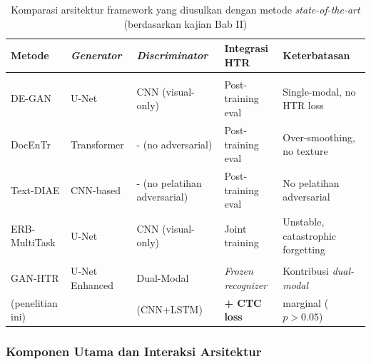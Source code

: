 \begin{table}[H]
\centering
\caption{Komparasi arsitektur framework yang diusulkan dengan metode \textit{state-of-the-art} (berdasarkan kajian Bab II)}
\label{tab:arsitektur-komparasi}
\footnotesize
\begin{tabularx}{\textwidth}{|>{\raggedright\arraybackslash}X|>{\raggedright\arraybackslash}X|>{\raggedright\arraybackslash}X|>{\raggedright\arraybackslash}X|>{\raggedright\arraybackslash}X|}
\hline
\textbf{Metode} & \textit{Generator} & \textit{Discriminator} & Integrasi HTR & Keterbatasan \\
\hline
\multicolumn{5}{|l|}{Metode \textit{Existing} (Bab II)} \\
\hline
DE-GAN & U-Net & CNN (visual-only) & Post-training eval & Single-modal, no HTR loss \\
\hline
DocEnTr & Transformer & - (no adversarial) & Post-training eval & Over-smoothing, no texture \\
\hline
Text-DIAE & CNN-based & - (no pelatihan adversarial) & Post-training eval & No pelatihan adversarial \\
\hline
ERB-MultiTask & U-Net & CNN (visual-only) & Joint training & Unstable, catastrophic forgetting \\
\hline
\multicolumn{5}{|l|}{\textit{Framework} yang Diusulkan} \\
\hline
GAN-HTR & U-Net Enhanced & Dual-Modal & \textit{Frozen recognizer} & Kontribusi \textit{dual-modal} \\
(penelitian ini) &  & (CNN+LSTM) & \textbf{+ CTC loss} & marginal ($p>0.05$) \\
\hline
\end{tabularx}
\end{table}


\subsubsection{Komponen Utama dan Interaksi Arsitektur} %
\label{subsubsec:komponen-arsitektur}

